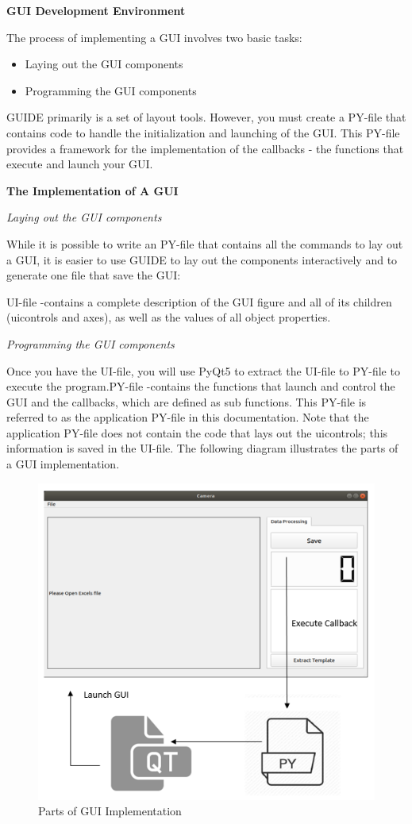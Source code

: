 \documentclass[journal, twocolumn]{IEEEtran}
\begin{document}
\textbf{GUI Development Environment}

The process of implementing a GUI involves two basic tasks:
\begin{itemize}
	\item Laying out the GUI components 
	\item Programming the GUI components
\end{itemize}
GUIDE primarily is a set of layout tools. However, you must create a PY-file that contains code to handle the initialization and launching of the GUI. This PY-file provides a framework for the implementation of the callbacks - the functions that execute and launch your GUI. 

\textbf{The Implementation of A GUI}

\textit{Laying out the GUI components}

While it is possible to write an PY-file that contains all the commands to lay out a GUI, it is easier to use GUIDE to lay out the components interactively and to generate one file that save the GUI:

UI-file -contains a complete description of the GUI figure and all of its children (uicontrols and axes), as well as the values of all object properties.

\textit{Programming the GUI components} 

Once you have the UI-file, you will use PyQt5 to extract the UI-file to PY-file to execute the program.PY-file -contains the functions that launch and control the GUI and the callbacks, which are defined as sub functions. This PY-file is referred to as the application PY-file in this documentation. Note that the application PY-file does not contain the code that lays out the uicontrols; this information is saved in the UI-file. The following diagram illustrates the parts of a GUI implementation.

\begin{figure}[!h]
	\centering
	\includegraphics[width=0.8\linewidth]{img/gui.png}
	\caption{Parts of GUI Implementation}\label{fig:gui}
\end{figure}
\end{document}
